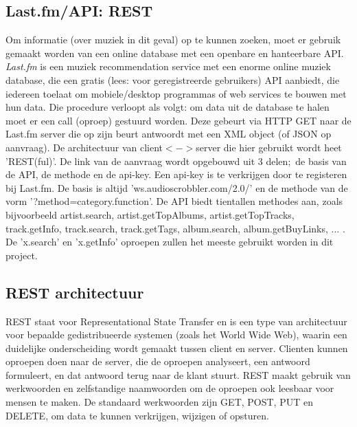 \documentclass[11pt,a4paper]{article}
\begin{document}
	\subsection{Last.fm/API: REST}
Om informatie (over muziek in dit geval) op te kunnen zoeken, moet er gebruik gemaakt worden van een online database met een openbare en hanteerbare API. \textit{Last.fm} is een muziek recommendation service met een enorme online muziek database, die  een gratis (lees: voor geregistreerde gebruikers) API aanbiedt, die iedereen toelaat om mobiele/desktop programmas of web services te bouwen met hun data.
\newline
Die procedure verloopt als volgt: om data uit de database te halen moet er een call (oproep) gestuurd worden. Deze gebeurt via HTTP GET naar de Last.fm server die op zijn beurt antwoordt met een XML object (of JSON op aanvraag). De architectuur van client$<->$server die hier gebruikt wordt heet 'REST(ful)'. 
\newline
De link van de aanvraag wordt opgebouwd uit 3 delen$;$ de basis van de API, de methode en de api-key. Een api-key is te verkrijgen door te registeren bij Last.fm. De basis is altijd 'ws.audioscrobbler.com/2.0/' en de methode van de vorm '?method=category.function'. 
De API biedt tientallen methodes aan, zoals bijvoorbeeld artist.search, artist.getTopAlbums, artist.getTopTracks, track.getInfo, track.search, track.getTags, album.search, album.getBuyLinks, ... . 
\\
De 'x.search' en 'x.getInfo' oproepen zullen het meeste gebruikt worden in dit project. 

	\subsection{REST architectuur}
	REST staat voor Representational State Transfer en is een type van architectuur voor bepaalde gedistribueerde systemen (zoals het World Wide Web), waarin een duidelijke onderscheiding wordt gemaakt tussen client en server. Clienten kunnen oproepen doen naar de server, die de oproepen analyseert, een antwoord formuleert, en dat antwoord terug naar de klant stuurt. REST maakt gebruik van werkwoorden en zelfstandige naamwoorden om de oproepen ook leesbaar voor mensen te maken. De standaard werkwoorden zijn GET, POST, PUT en DELETE, om data te kunnen verkrijgen, wijzigen of opsturen.
	
\end{document}
